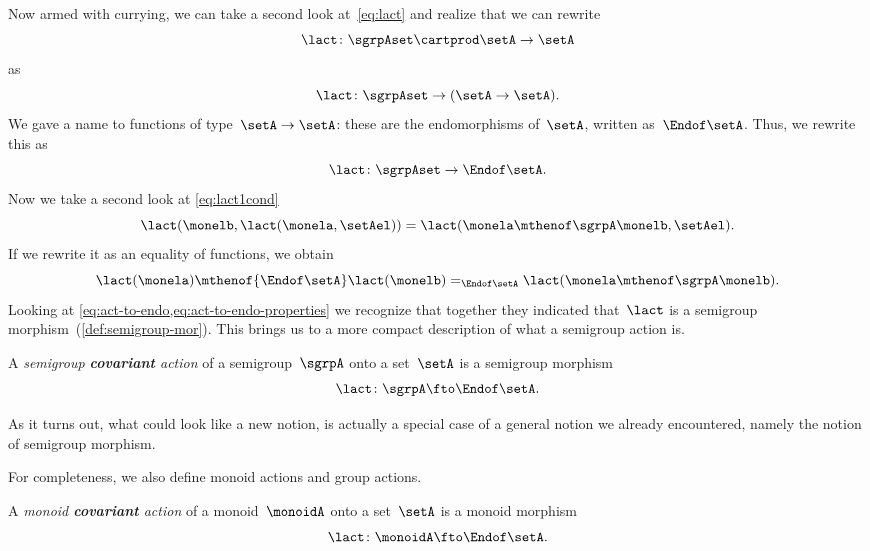 Now armed with currying, we can take a second look at~\cref{eq:lact} and realize that we can rewrite
\begin{equation}
    \label{eq:currying-lact-1}
    \lact \colon \sgrpAset \cartprod \setA \to \setA
\end{equation}
as
\begin{equation}
    \label{eq:currying-lact-2}
    \lact \colon \sgrpAset \to (\setA \to \setA).
\end{equation}
%
We gave a name to functions of type~$\setA \to \setA$: these are the endomorphisms of~$\setA$, written as~$\Endof\setA$.
Thus, we rewrite this as
%
\begin{equation}
    \label{eq:act-to-endo}
    \lact \colon \sgrpAset \to \Endof\setA.
\end{equation}
%
Now we take a second look at \cref{eq:lact1cond}
%
\begin{equation}
    \label{eq:lact1cond-2}
    \lact(\monelb, \lact(\monela, \setAel)) = \lact(\monela \mthenof\sgrpA \monelb, \setAel).
\end{equation}
%
If we rewrite it as an equality of functions, we obtain
%
\begin{equation}
    \label{eq:act-to-endo-properties}
    \lact(\monela) \mthenof{\Endof\setA}  \lact(\monelb) =_{\Endof\setA} \lact(\monela \mthenof\sgrpA \monelb).
\end{equation}
%
Looking at \cref{eq:act-to-endo,eq:act-to-endo-properties} we recognize that together they indicated that~$\lact$ is a semigroup morphism~(\cref{def:semigroup-mor}).
This brings us to a more compact description of what a semigroup action is.

\begin{ctdefinition}
    \label{def:semigroup-cov-action}
    A \emph{semigroup \textbf{covariant} action} of a semigroup~$\sgrpA$ onto a set~$\setA$ is a semigroup morphism
    \begin{equation}
        \label{eq:act-semigroup}
        \lact \colon \sgrpA \fto \Endof\setA.
    \end{equation}
\end{ctdefinition}

As it turns out, what could look like a new notion, is actually a special case of a general notion we already encountered, namely the notion of semigroup morphism.

For completeness, we also define monoid actions and group actions.

\begin{ctdefinition}
    \label{def:monoid-cov-action}
    A \emph{monoid \textbf{covariant} action} of a monoid~$\monoidA$ onto a set~$\setA$ is a monoid morphism
    \begin{equation}
        \label{eq:act-monoid}
        \lact \colon \monoidA \fto \Endof\setA.
    \end{equation}
\end{ctdefinition}

